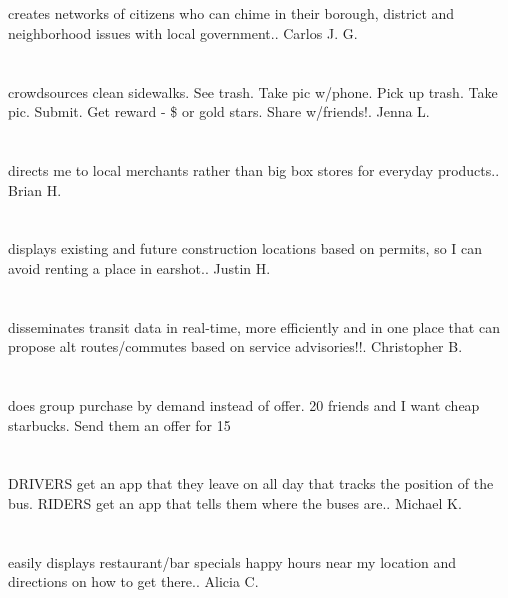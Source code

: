 \section{}creates networks of citizens who can chime in their borough,  district and neighborhood issues with local government.. Carlos J.  G.
\section{}crowdsources clean sidewalks. See trash. Take pic w/phone. Pick up trash. Take pic. Submit. Get reward - \$ or gold stars. Share w/friends!. Jenna L.
\section{}directs me to local merchants rather than big box stores for everyday products.. Brian H.
\section{}displays existing and future construction locations based on permits,  so I can avoid renting a place in earshot.. Justin H.
\section{}disseminates transit data in real-time,  more efficiently and in one place that can propose alt routes/commutes based on service advisories!!. Christopher B.
\section{}does group purchase by demand instead of offer. 20 friends and I want cheap starbucks. Send them an offer for 15%
\section{}DRIVERS get an app that they leave on all day that tracks the position of the bus. RIDERS get an app that tells them where the buses are.. Michael K.
\section{}easily displays restaurant/bar specials happy hours near my location and directions on how to get there.. Alicia C.
